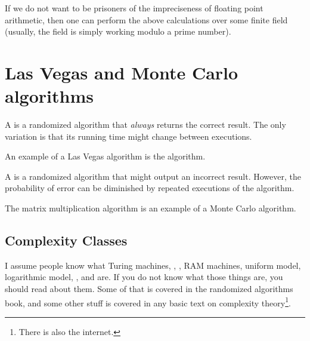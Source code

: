 If we do not want to be prisoners of the impreciseness of floating
point arithmetic, then one can perform the above calculations over
some finite field (usually, the field is simply working modulo a prime
number).


\section{Las Vegas and Monte Carlo algorithms}

\begin{defn}
    A  is a
    randomized algorithm that {\em always} returns the correct result.
    The only variation is that its running time might change between
    executions.
\end{defn}

An example of a Las Vegas algorithm is the 
algorithm.

\begin{defn}
    A 
    is a randomized algorithm that might output an incorrect result.
    However, the probability of error can be diminished by repeated
    executions of the algorithm.
\end{defn}

The matrix multiplication algorithm is an example of a Monte Carlo
algorithm.

\subsection{Complexity Classes}

I assume people know what Turing machines, ,
, RAM machines, uniform model, logarithmic model,
, and  are. If you do not know what those
things are, you should read about them. Some of that is covered in the
randomized algorithms book, and some other stuff is covered in any
basic text on complexity theory\footnote{There is also the internet.}.


